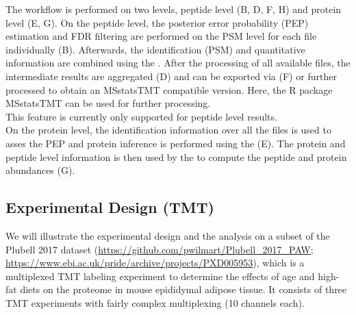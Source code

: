The workflow is performed on two levels, peptide level (B, D, F, H) and protein level (E, G). On the peptide level, the posterior error probability (PEP) estimation and FDR filtering are performed on the PSM level for each file individually (B). Afterwards, the identification (PSM) and quantitative information are combined using the . After the processing of all available files, the intermediate results are aggregated (D) and can be exported via  (F) or further processed to obtain an MSstatsTMT compatible version. Here, the R package MSstatsTMT can be used for further processing. \\

This feature is currently only supported for peptide level results. \\

On the protein level, the identification information over all the files is used to asses the PEP and protein inference is performed using the  (E). The protein and peptide level information is then used by the to compute the peptide and protein abundances (G).  

\subsection{Experimental Design (TMT)}
We will illustrate the experimental design and the analysis on a subset of the Plubell 2017 dataset (\url{https://github.com/pwilmart/Plubell_2017_PAW; https://www.ebi.ac.uk/pride/archive/projects/PXD005953}), which is a multiplexed TMT labeling experiment to determine the effects of age and high-fat diets on the proteome in mouse epididymal adipose tissue. It consists of three TMT experiments with fairly complex multiplexing (10 channels each). 
